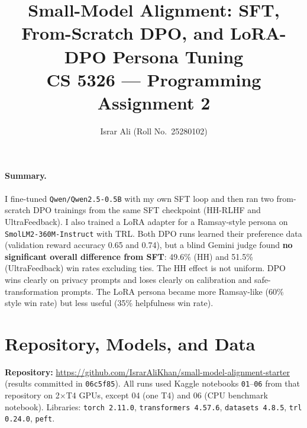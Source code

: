 \documentclass[10pt]{article}
\title{\vspace{-1.6em}\textbf{Small-Model Alignment: SFT, From-Scratch DPO, and LoRA-DPO Persona Tuning}\\[2pt]
\large CS 5326 --- Programming Assignment 2}
\author{Israr Ali \quad (Roll No.\ 25280102)}
\date{\vspace{-0.6em}}
\newcommand{\code}[1]{\texttt{\small #1}}
\begin{document}
\maketitle
\vspace{-1.8em}

\paragraph{Summary.}
I fine-tuned \code{Qwen/Qwen2.5-0.5B} with my own SFT loop and then ran two from-scratch DPO trainings from the same SFT checkpoint (HH-RLHF and UltraFeedback). I also trained a LoRA adapter for a Ramsay-style persona on \code{SmolLM2-360M-Instruct} with TRL. Both DPO runs learned their preference data (validation reward accuracy 0.65 and 0.74), but a blind Gemini judge found \textbf{no significant overall difference from SFT}: 49.6\% (HH) and 51.5\% (UltraFeedback) win rates excluding ties. The HH effect is not uniform. DPO wins clearly on privacy prompts and loses clearly on calibration and safe-transformation prompts. The LoRA persona became more Ramsay-like (60\% style win rate) but less useful (35\% helpfulness win rate).

\section{Repository, Models, and Data}
\textbf{Repository:} \url{https://github.com/IsrarAliKhan/small-model-alignment-starter} (results committed in \code{06c5f85}). All runs used Kaggle notebooks \code{01}--\code{06} from that repository on 2$\times$T4 GPUs, except 04 (one T4) and 06 (CPU benchmark notebook). Libraries: \code{torch 2.11.0}, \code{transformers 4.57.6}, \code{datasets 4.8.5}, \code{trl 0.24.0}, \code{peft}.
\end{document}
